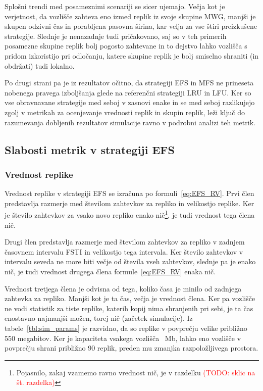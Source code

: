\documentclass[a4paper, 12pt]{book}
\newcommand{\TODO}[1]{\textcolor{red}{(TODO: #1)}}
\begin{document}
Splošni trendi med posameznimi scenariji se sicer ujemajo. Večja kot je
verjetnost, da vozlišče zahteva eno izmed replik iz svoje skupine MWG, manjši
je skupen odzivni čas in porabljena pasovna širina, kar velja za vse štiri
preizkušene strategije. Slednje je nenazadnje tudi pričakovano, saj so v teh
primerih posamezne skupine replik bolj pogosto zahtevane in to dejstvo lahko
vozlišča s pridom izkoristijo pri odločanju, katere skupine replik je bolj
smiselno shraniti (in obdržati) tudi lokalno.

Po drugi strani pa je iz rezultatov očitno, da strategiji EFS in MFS ne
prineseta nobenega pravega izboljšanja glede na referenčni strategiji LRU in
LFU. Ker so vse obravnavane strategije med seboj v zasnovi enake in se med
seboj razlikujejo zgolj v metrikah za ocenjevanje vrednosti replik in skupin
replik, leži ključ do razumevanja dobljenih rezultatov simulacije ravno v
podrobni analizi teh metrik.


\subsection{Slabosti metrik v strategiji EFS}

\subsubsection{Vrednost replike}

Vrednost replike v strategiji EFS se izračuna po formuli~\eqref{eq:EFS_RV}.
Prvi člen predstavlja razmerje med številom zahtevkov za repliko in velikostjo
replike. Ker je število zahtevkov za vsako novo repliko enako nič\footnote{%
Pojasnilo, zakaj vzamemo ravno vrednost nič, je v razdelku \TODO{sklic na
št. razdelka}}, je tudi vrednost tega člena nič.

Drugi člen predstavlja razmerje med številom zahtevkov za repliko v zadnjem
časovnem intervalu FSTI in velikostjo tega intervala. Ker število zahtevkov
v intervalu seveda ne more biti večje od števila vseh zahtevkov,
slednje pa je enako nič, je tudi vrednost drugega člena
formule~\eqref{eq:EFS_RV} enaka nič.

Vrednost tretjega člena je odvisna od tega, koliko časa je minilo
od zadnjega zahtevka za repliko. Manjši kot je ta čas, večja je vrednost člena.
Ker pa vozlišče ne vodi statistik za tiste replike, katerih kopij nima
shranjenih pri sebi, je ta čas enostavno najmanjši možen, torej nič (začetek
simulacije). Iz tabele~\ref{tbl:sim_params} je razvidno, da so replike v
povprečju velike približno 550 megabitov. Ker je kapaciteta vsakega vozlišča
~Mb, lahko eno vozlišče v povprečju shrani približno 90
replik, preden mu zmanjka razpoložljivega prostora.
\end{document}
